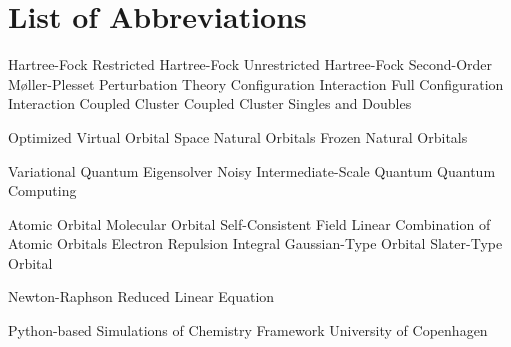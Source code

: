\chapter*{List of Abbreviations}


\begin{acronym}[CCSD(T)]  %
        {Hartree-Fock}
       {Restricted Hartree-Fock}
       {Unrestricted Hartree-Fock}
       {Second-Order Møller-Plesset Perturbation Theory}
        {Configuration Interaction}
       {Full Configuration Interaction}
        {Coupled Cluster}
      {Coupled Cluster Singles and Doubles}

      {Optimized Virtual Orbital Space}
        {Natural Orbitals}
        {Frozen Natural Orbitals}

       {Variational Quantum Eigensolver}
      {Noisy Intermediate-Scale Quantum}
        {Quantum Computing}

        {Atomic Orbital}
        {Molecular Orbital}
       {Self-Consistent Field}
      {Linear Combination of Atomic Orbitals}
       {Electron Repulsion Integral}
       {Gaussian-Type Orbital}
       {Slater-Type Orbital}

        {Newton-Raphson}
       {Reduced Linear Equation}

     {Python-based Simulations of Chemistry Framework}
      {University of Copenhagen}
\end{acronym}
